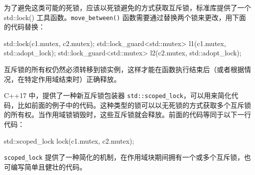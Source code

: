 为了避免这类可能的死锁，应该以死锁避免的方式获取互斥锁，标准库提供了一个 std::lock() 工具函数。\verb|move_between()| 函数需要通过替换两个锁来更改，用下面的代码替换：

\begin{cpp}
std::lock(c1.mutex, c2.mutex);
std::lock_guard<std::mutex> l1(c1.mutex, std::adopt_lock);
std::lock_guard<std::mutex> l2(c2.mutex, std::adopt_lock);
\end{cpp}

互斥锁的所有权仍然必须转移到锁实例，这样才能在函数执行结束后（或者根据情况，在特定作用域结束时）正确释放。

C++17 中，提供了一种新互斥锁包装器 \verb|std::scoped_lock|，可以用来简化代码，比如前面的例子中的代码。这种类型的锁可以以无死锁的方式获取多个互斥锁的所有权。当作用域锁销毁时，这些互斥锁就会释放。前面的代码等同于以下一行代码：

\begin{cpp}
std::scoped_lock lock(c1.mutex, c2.mutex);
\end{cpp}

\verb|scoped_lock| 提供了一种简化的机制，在作用域块期间拥有一个或多个互斥锁，也可编写简单且健壮的代码。








